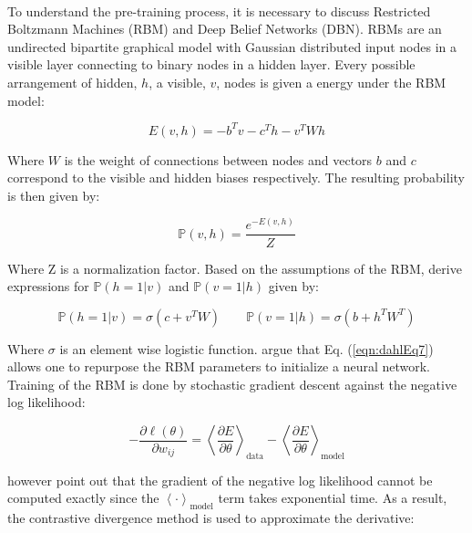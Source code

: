 \documentclass[letterpaper]{article}
\newcommand{\cprob}[2]{ \prob{#1 \lvert #2} }
\newcommand{\prob}[1]{\mathbb{P}\left( #1 \right)}
\newcommand{\partialDx}[2]{\frac{\partial #1}{ \partial #2  }}
\newcommand{\inAngle}[1]{\left \langle #1 \right \rangle}
\begin{document}
\paragraph{} To understand the pre-training process, it is necessary to discuss Restricted Boltzmann Machines (RBM) and Deep Belief Networks (DBN). RBMs are an undirected bipartite graphical model with Gaussian distributed input nodes in a visible layer connecting to binary nodes in a hidden layer. Every possible arrangement of hidden, $h$, a visible, $v$, nodes is given a energy under the RBM model: 

\begin{equation}
E(v, h) = - b^T v - c^T h - v^T W h
\end{equation}

Where $W$ is the weight of connections between nodes and vectors $b$ and $c$ correspond to the visible and hidden biases respectively. The resulting probability is then given by:

\begin{equation}
\prob{v, h} = \frac{e^{-E(v, h)}}{Z}
\end{equation}

Where Z is a normalization factor. Based on the assumptions of the RBM, \cite{DBLP:journals/taslp/DahlYDA12} derive expressions for $\cprob{h = 1}{v}$ and $\cprob{v = 1}{h}$ given by:

\begin{equation}
\cprob{h = 1}{v} = \sigma(c + v^T W) \qquad \cprob{v = 1}{h} = \sigma(b + h^T W^T)
\label{eqn:dahlEq7}
\end{equation}

Where $\sigma$ is an element wise logistic function. \cite{DBLP:journals/taslp/DahlYDA12} argue that Eq. (\ref{eqn:dahlEq7}) allows one to repurpose the RBM parameters to initialize a neural network. Training of the RBM is done by stochastic gradient descent against the negative log likelihood:

\begin{equation}
	- \partialDx{\ell(\theta)}{w_{ij}} = \inAngle{ \partialDx{E}{\theta} }_\text{data} - \inAngle{ \partialDx{E}{\theta} }_\text{model}
\end{equation}

however \cite{DBLP:journals/taslp/DahlYDA12} point out that the gradient of the negative log likelihood cannot be computed exactly since the $\inAngle{ \cdot }_\text{model}$ term takes exponential time. As a result, the contrastive divergence method is used to approximate the derivative:
\end{document}
